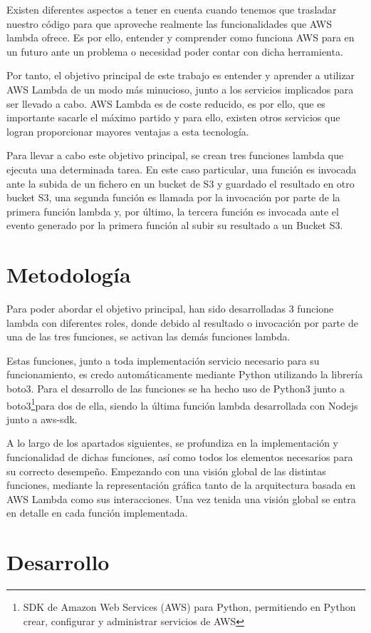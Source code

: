 \documentclass[
]{article}
\begin{document}
Existen diferentes aspectos a tener en cuenta cuando tenemos que
trasladar nuestro código para que aproveche realmente las
funcionalidades que AWS lambda ofrece. Es por ello, entender y
comprender como funciona AWS para en un futuro ante un problema o
necesidad poder contar con dicha herramienta.

Por tanto, el objetivo principal de este trabajo es entender y aprender
a utilizar AWS Lambda de un modo más minucioso, junto a los servicios
implicados para ser llevado a cabo. AWS Lambda es de coste reducido, es
por ello, que es importante sacarle el máximo partido y para ello,
existen otros servicios que logran proporcionar mayores ventajas a esta
tecnología.

Para llevar a cabo este objetivo principal, se crean tres funciones
lambda que ejecuta una determinada tarea. En este caso particular, una
función es invocada ante la subida de un fichero en un bucket de S3 y
guardado el resultado en otro bucket S3, una segunda función es llamada
por la invocación por parte de la primera función lambda y, por último,
la tercera función es invocada ante el evento generado por la primera
función al subir su resultado a un Bucket S3.

\hypertarget{header-n14}{%
\section{Metodología}\label{header-n14}}

Para poder abordar el objetivo principal, han sido desarrolladas 3
funcione lambda con diferentes roles, donde debido al resultado o
invocación por parte de una de las tres funciones, se activan las demás
funciones lambda.

Estas funciones, junto a toda implementación servicio necesario para su
funcionamiento, es credo automáticamente mediante Python utilizando la
librería boto3. Para el desarrollo de las funciones se ha hecho uso de
Python3 junto a boto3\footnote{SDK de Amazon Web Services (AWS) para
  Python, permitiendo en Python crear, configurar y administrar
  servicios de AWS}para dos de ella, siendo la última función lambda
desarrollada con Nodejs junto a aws-sdk.

A lo largo de los apartados siguientes, se profundiza en la
implementación y funcionalidad de dichas funciones, así como todos los
elementos necesarios para su correcto desempeño. Empezando con una
visión global de las distintas funciones, mediante la representación
gráfica tanto de la arquitectura basada en AWS Lambda como sus
interacciones. Una vez tenida una visión global se entra en detalle en
cada función implementada.
\newpage
\hypertarget{header-n19}{%
\section{Desarrollo}\label{header-n19}}
\end{document}
